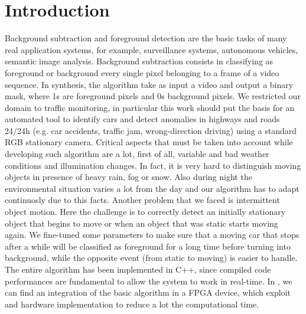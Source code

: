 \section*{Introduction}
Background subtraction and foreground detection are the basic tasks of many real application systems,
for example, surveillance systems, autonomous vehicles, semantic image analysis. Background subtraction
consists in classifying as foreground or background every single pixel belonging to a frame of a video sequence. In synthesis, the algorithm take as input a video and output a binary mask, where 1s are foreground pixels and 0s background pixels.
We restricted our domain to traffic monitoring, in particular this work should put the basis for an automated
tool to identify cars and detect anomalies in highways and roads 24/24h (e.g. car accidents,
traffic jam, wrong-direction driving) using a standard RGB stationary camera.
Critical aspects that must be taken into account while developing such algorithm are a lot, first of all,
variable and bad weather conditions and illumination changes. In fact, it is very hard to distinguish
moving objects in presence of heavy rain, fog or snow. Also during night the environmental situation varies
a lot from the day and our algorithm has to adapt continuosly due to this facts. 
Another problem that we faced is intermittent object motion. Here the challenge is to correctly detect an initially stationary object that begins to
move or when an object that was static starts moving again. We fine-tuned some parameters to make sure
that a moving car that stops after a while will be classified as foreground for a long time before turning
into background, while the opposite event (from static to moving) is easier to handle.
The entire algorithm has been implemented in C++, since compiled code performances are fundamental to
allow the system to work in real-time. In \cite{pbas_and_scene_analysis_fpga}, we can find an integration of
the basic algorithm in a FPGA device, which exploit and hardware implementation to reduce a lot the computational time.

